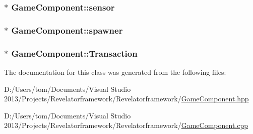 \hypertarget{class_game_component_ad585bf57df228afc83fbf777142e51bd}{
\subsubsection[{sensor}]{$\ast$ Game\-Component\-::sensor\hspace{0.3cm}{\ttfamily [protected]}}}\label{class_game_component_ad585bf57df228afc83fbf777142e51bd}
\hypertarget{class_game_component_a15caaab21ec2e8eb9d438a25afbef4da}{
\subsubsection[{spawner}]{$\ast$ Game\-Component\-::spawner\hspace{0.3cm}{\ttfamily [protected]}}}\label{class_game_component_a15caaab21ec2e8eb9d438a25afbef4da}
\hypertarget{class_game_component_ae8c59f47f6723d108eb481a160607e98}{
\subsubsection[{Transaction}]{$\ast$ Game\-Component\-::\-Transaction\hspace{0.3cm}{\ttfamily [protected]}}}\label{class_game_component_ae8c59f47f6723d108eb481a160607e98}


The documentation for this class was generated from the following files\-:\begin{DoxyCompactItemize}
\item 
D\-:/\-Users/tom/\-Documents/\-Visual Studio 2013/\-Projects/\-Revelatorframework/\-Revelatorframework/\hyperlink{_game_component_8hpp}{Game\-Component.\-hpp}\item 
D\-:/\-Users/tom/\-Documents/\-Visual Studio 2013/\-Projects/\-Revelatorframework/\-Revelatorframework/\hyperlink{_game_component_8cpp}{Game\-Component.\-cpp}\end{DoxyCompactItemize}
